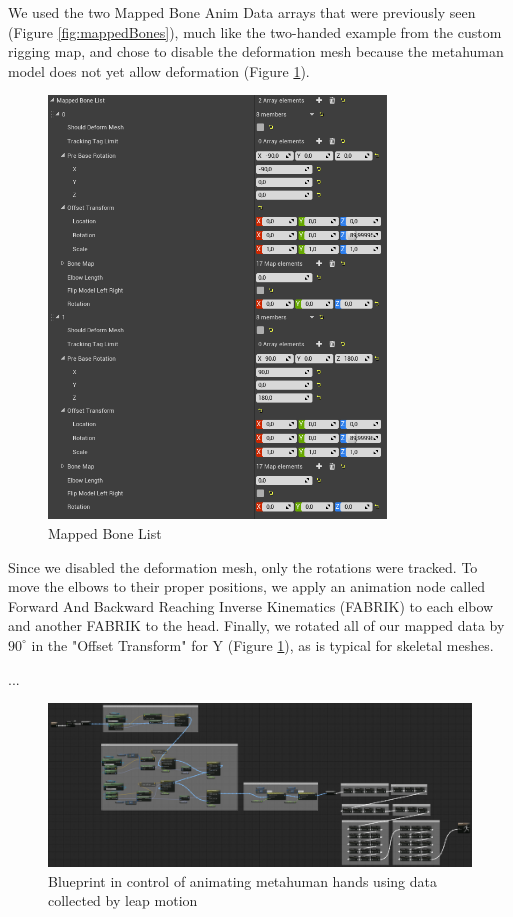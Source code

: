 We used the two Mapped Bone Anim Data arrays that were previously seen (Figure \ref{fig:mappedBones}), much like the two-handed example from the custom rigging map, and chose to disable the deformation mesh because the metahuman model does not yet allow deformation (Figure \ref{fig:mappedBoneList}).

\begin{figure}[!htb]
\includegraphics[width=0.8\textwidth]{figures/mappedBoneList.png}
\centering
\caption{Mapped Bone List}
\label{fig:mappedBoneList}
\end{figure}

Since we disabled the deformation mesh, only the rotations were tracked. To move the elbows to their proper positions, we apply an animation node called Forward And Backward Reaching Inverse Kinematics (FABRIK) to each elbow and another FABRIK to the head. Finally, we rotated all of our mapped data by $90^\circ$ in the "Offset Transform" for Y (Figure \ref{fig:mappedBoneList}), as is typical for skeletal meshes.

...

\begin{figure}[!htb]
\includegraphics[width=\textwidth]{figures/BPHandsAndIK.png}
\centering
\caption{Blueprint in control of animating metahuman hands using data collected by leap motion}
\label{fig:BPHandsAndIK}
\end{figure}

